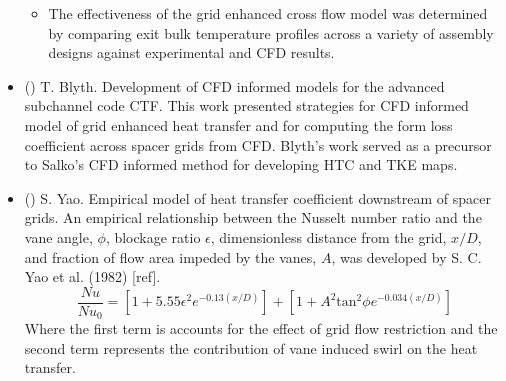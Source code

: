 \begin{itemize}
\begin{itemize}
            \item The effectiveness of the grid enhanced cross flow model was determined by comparing exit bulk temperature profiles across a variety of assembly designs against experimental and CFD results.
            
        \end{itemize}
        
    \item (\checkmark) T. Blyth.  Development of CFD informed models for the advanced subchannel code CTF.  This work presented strategies for CFD informed model of grid enhanced heat transfer and for computing the form loss coefficient across spacer grids from CFD.  Blyth's work served as a precursor to Salko's CFD informed method for developing HTC and TKE maps.
    
    \item (\checkmark) S. Yao.  Empirical model of heat transfer coefficient downstream of spacer grids. \cite{yao82}
    An empirical relationship between the Nusselt number ratio and the vane angle, $\phi$, blockage ratio $\epsilon$, dimensionless distance from the grid, $x/D$, and fraction of flow area impeded by the vanes, $A$, was developed by S. C. Yao et al. (1982) [ref].
\begin{equation}
\frac{Nu}{Nu_0}  = \left[ 1 + 5.55 \epsilon^2 e^{-0.13(x/D)}\right] + \left[ 1 + A^2\mathrm{tan}^2\phi e^{-0.034(x/D)} \right]
\end{equation}
Where the first term is accounts for the effect of grid flow restriction and the second term represents the contribution of vane induced swirl on the heat transfer.


\end{itemize}
